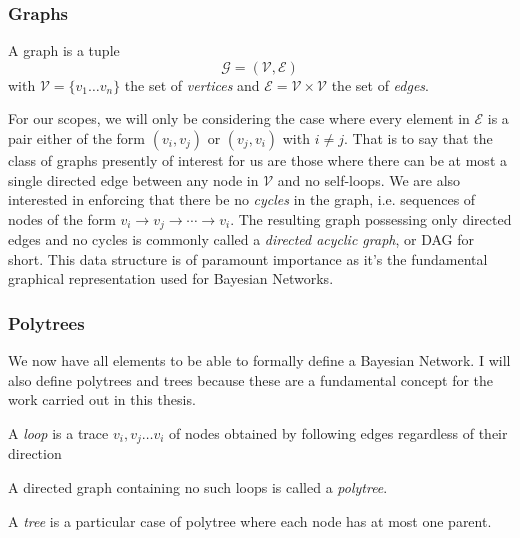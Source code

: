 \subsubsection{Graphs}
\begin{definition}
	A graph is a tuple 
	\begin{equation}
	\mathcal{G} = (\mathcal{V}, \mathcal{E})
\end{equation}
with $\mathcal{V} = \{ v_1 \ldots v_n \}$ the set of \textit{vertices} and $\mathcal{E} = \mathcal{V} \times \mathcal{V}$ the set of \textit{edges}.
\end{definition}

For our scopes, we will only be considering the case where every element in $\mathcal{E}$ is a pair either of the form $(v_i, v_j)$ or $(v_j, v_i)$ with $i \neq j$.  
That is to say that the class of graphs presently of interest for us are those where there can be at most a single directed edge between any node in $\mathcal{V}$ and no self-loops.
We are also interested in enforcing that there be no \textit{cycles} in the graph, i.e. sequences of nodes of the form $v_i \rightarrow v_j \rightarrow \cdots \rightarrow v_i$.
The resulting graph possessing only directed edges and no cycles is commonly called a \textit{directed acyclic graph}, or DAG for short.  
This data structure is of paramount importance as it's the fundamental graphical representation used for Bayesian Networks.

\subsubsection{Polytrees}
We now have all elements to be able to formally define a Bayesian Network.
I will also define polytrees and trees because these are a fundamental concept for the work carried out in this thesis.
\begin{definition}
	A \textit{loop} is a trace $v_i, v_j \ldots v_i$ of nodes obtained by following edges regardless of their direction
\end{definition}
\begin{definition}
	A directed graph containing no such loops is called a \textit{polytree}. 
\end{definition}
\begin{definition}
	A \textit{tree} is a particular case of polytree where each node has at most one parent.	
\end{definition}

